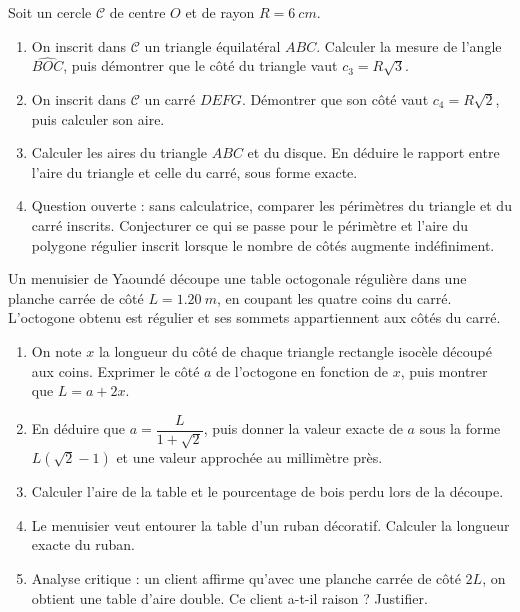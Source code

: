 \documentclass[11pt]{article}
\begin{document}
\begin{exercice}
Soit un cercle $\mathcal{C}$ de centre $O$ et de rayon $R = \SI{6}{cm}$.
\begin{enumerate}
\item On inscrit dans $\mathcal{C}$ un triangle équilatéral $ABC$. Calculer la mesure de l'angle $\widehat{BOC}$, puis démontrer que le côté du triangle vaut $c_3 = R\sqrt{3}$.
\item On inscrit dans $\mathcal{C}$ un carré $DEFG$. Démontrer que son côté vaut $c_4 = R\sqrt{2}$, puis calculer son aire.
\item Calculer les aires du triangle $ABC$ et du disque. En déduire le rapport entre l'aire du triangle et celle du carré, sous forme exacte.
\item Question ouverte : sans calculatrice, comparer les périmètres du triangle et du carré inscrits. Conjecturer ce qui se passe pour le périmètre et l'aire du polygone régulier inscrit lorsque le nombre de côtés augmente indéfiniment.
\end{enumerate}
\end{exercice}

\begin{exercice}
Un menuisier de Yaoundé découpe une table octogonale régulière dans une planche carrée de côté $L = \SI{1,20}{m}$, en coupant les quatre coins du carré. L'octogone obtenu est régulier et ses sommets appartiennent aux côtés du carré.
\begin{enumerate}
\item On note $x$ la longueur du côté de chaque triangle rectangle isocèle découpé aux coins. Exprimer le côté $a$ de l'octogone en fonction de $x$, puis montrer que $L = a + 2x$.
\item En déduire que $a = \dfrac{L}{1+\sqrt{2}}$, puis donner la valeur exacte de $a$ sous la forme $L(\sqrt{2}-1)$ et une valeur approchée au millimètre près.
\item Calculer l'aire de la table et le pourcentage de bois perdu lors de la découpe.
\item Le menuisier veut entourer la table d'un ruban décoratif. Calculer la longueur exacte du ruban.
\item Analyse critique : un client affirme qu'avec une planche carrée de côté $2L$, on obtient une table d'aire double. Ce client a-t-il raison ? Justifier.
\end{enumerate}
\end{exercice}
\end{document}
